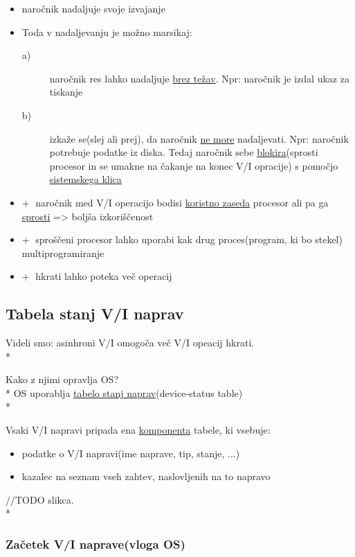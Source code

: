 \documentclass[
  slovene,
  a4paper
]{book}
\begin{document}
\begin{itemize}
  \item naročnik nadaljuje svoje izvajanje
  \item Toda v nadaljevanju je možno marsikaj:
    \begin{description}
      \item[a)] naročnik res lahko nadaljuje \underline{brez težav}. Npr: naročnik je izdal ukaz za tiskanje
      \item[b)] izkaže se(slej ali prej), da naročnik \underline{ne more} nadaljevati. Npr: naročnik potrebuje podatke iz diska. Tedaj naročnik sebe \underline{blokira}(sprosti procesor in se umakne na čakanje na konec V/I opracije) s pomočjo \underline{sistemskega klica}
    \end{description}
  \item \textcircled{+} naročnik med V/I operacijo bodisi \underline{koristno zaseda} procesor ali pa ga \underline{sprosti} => boljša izkoriščenost
  \item \textcircled{+} sproščeni procesor lahko uporabi kak drug proces(program, ki bo stekel) ~ multiprogramiranje
  \item \textcircled{+} hkrati lahko poteka več operacij
\end{itemize}

\subsection{Tabela stanj V/I naprav}

Videli smo: asinhroni V/I omogoča več V/I opeacij hkrati.\\*

Kako z njimi opravlja OS?\\*
OS uporablja \underline{tabelo stanj naprav}(device-status table)\\*

Vsaki V/I napravi pripada ena \underline{komponenta} tabele, ki vsebuje:
\begin{itemize}
  \item podatke o V/I napravi(ime naprave, tip, stanje, ...)
  \item kazalec na seznam vseh zahtev, naslovljenih na to  napravo
\end{itemize}

//TODO slikca.\\*

\subsubsection{Začetek V/I naprave(vloga OS)}
\end{document}
